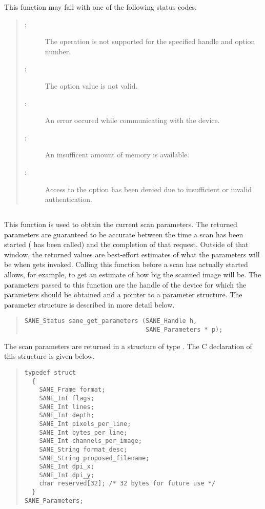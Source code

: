 \documentclass[11pt,DVIps]{report}
\begin{document}
This function may fail with one of the following status codes.
\begin{quote}
\begin{description}
\item[:] The operation is not
  supported for the specified handle and option number.
\item[:] The option value is not valid.
\item[:] An error occured while
  communicating with the device.
\item[:] An insufficent amount of memory
  is available.
\item[:] Access to the option has
  been denied due to insufficient or invalid authentication.
\end{description}
\end{quote}



\subsection{\label{sec:sanegetparameters}}

This function is used to obtain the current scan parameters.  The
returned parameters are guaranteed to be accurate between the time a
scan has been started ( has been called) and the
completion of that request.  Outside of that window, the returned
values are best-effort estimates of what the parameters will be when
 gets invoked.  Calling this function before a
scan has actually started allows, for example, to get an estimate of
how big the scanned image will be.  The parameters passed to this
function are the handle  of the device for which the
parameters should be obtained and a pointer  to a parameter
structure.  The parameter structure is described in more detail below.

\begin{quote}
\begin{verbatim}
SANE_Status sane_get_parameters (SANE_Handle h,
                                 SANE_Parameters * p);
\end{verbatim}
\end{quote}

The scan parameters are returned in a structure of type
.  The C declaration of this structure
is given below.
\begin{changebar}
\begin{quote}
\begin{verbatim}
typedef struct
  {
    SANE_Frame format;
    SANE_Int flags;
    SANE_Int lines;
    SANE_Int depth;
    SANE_Int pixels_per_line;
    SANE_Int bytes_per_line;
    SANE_Int channels_per_image;
    SANE_String format_desc;
    SANE_String proposed_filename;
    SANE_Int dpi_x;
    SANE_Int dpi_y;
    char reserved[32]; /* 32 bytes for future use */
  }
SANE_Parameters;
\end{verbatim}
\end{quote}
\end{changebar}
\end{document}
